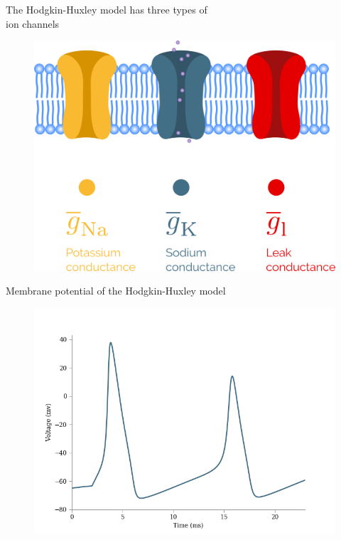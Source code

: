 \documentclass[presentation]{beamer}
\begin{document}

\begin{frame}{The Hodgkin-Huxley model has three types of \\ion channels}
  \vspace{-5mm}
  \begin{figure}
    \includegraphics[height=0.82\textheight]{deterministic_channels.png}
  \end{figure}
\end{frame}



\begin{frame}{Membrane potential of the Hodgkin-Huxley model}
  \vspace{-5mm}
  \begin{figure}
    \includegraphics[width=\textwidth]{hh_single.png}
  \end{figure}

\end{frame}
\end{document}
